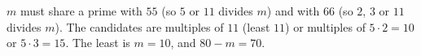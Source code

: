 $m$ must share a prime with $55$ (so $5$ or $11$ divides $m$) and with $66$ (so $2$, $3$ or $11$ divides $m$). The candidates are multiples of $11$ (least $11$) or multiples of $5\cdot2=10$ or $5\cdot3=15$. The least is $m=10$, and $80-m=\boxed{70}$.
